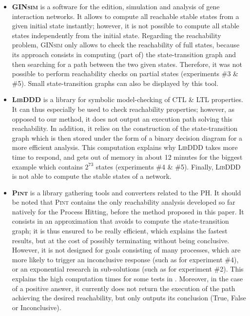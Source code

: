 \begin{itemize}[leftmargin=*]

\item \textbf{\textsc{GINsim}} is a software for the edition, simulation and analysis
of gene interaction networks.
It allows to compute all reachable stable states from a given initial state instantly;
however, it is not possible to compute all stable states independently from the initial state.
Regarding the reachability problem, \textsc{GINsim} only allows to check the reachability of
full states, because its approach consists in computing
(part of) the state-transition graph and then searching for a path between the two given states.
Therefore, it was not possible to perform reachability checks on partial states
(experiments \#3 \& \#5).
Small state-transition graphs can also be displayed by this tool.

\item \textbf{\textsc{LibDDD}}
is a library for symbolic model-checking of CTL \& LTL properties.
It can thus especially be used to check reachability properties;
however, as opposed to our method, it does not output an execution path
solving this reachability.
In addition, it relies on the construction of the state-transition graph
which is then stored under the form of a binary decision diagram for a more efficient analysis.
This computation explains why \textsc{LibDDD} takes more time to respond,
and gets out of memory in about 12 minutes for the biggest example
which contains $2^{73}$ states
(experiments \#4 \& \#5).
Finally, \textsc{LibDDD} is not able to compute the stable states of a network.

\item \textbf{\textsc{Pint}}
is a library gathering tools and converters related to the PH.
It should be noted that \textsc{Pint} contains the only reachability analysis
developed so far natively for the Process Hitting,
before the method proposed in this paper.
It consists in an approximation that avoids to compute the state-transition graph;
it is thus ensured to be really efficient, which explains the fastest results,
but at the cost of possibly terminating without being conclusive.
However, it is not designed for goals consisting of many processes,
which are more likely to trigger an inconclusive response
(such as for experiment \#4),
or an exponential research in sub-solutions
(such as for experiment \#2).
This explains the high computation times for some tests in .
Moreover, in the case of a positive answer,
it currently does not return the execution of the path achieving the desired reachability,
but only outputs its conclusion (True, False or Inconclusive).


\end{itemize}
